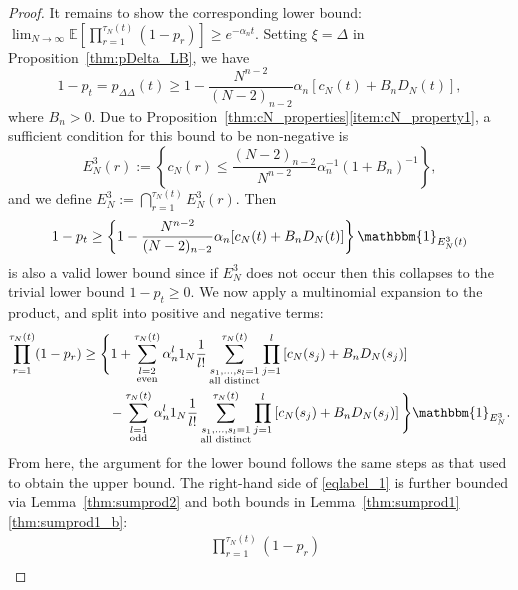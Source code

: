 \documentclass[12pt,authoryear]{article}
\theoremstyle{definition}
\newcommand{\E}{\mathbb{E}}
\newcommand{\1}[1]{\mathbbm{1}_{#1}}
\newcommand{\ON}{1_N}
\begin{document}
\begin{proof}
It remains to show the corresponding lower bound: $\lim_{N\to\infty} \E[ \prod_{r=1}^{\tau_N(t)} (1-p_r) ] 
\geq e^{-\alpha_n t}$.
Setting $\xi=\Delta$ in Proposition~\ref{thm:pDelta_LB}, we have
\begin{equation}\label{eq:pDeltaDelta_LB}
1-p_t
= p_{\Delta\Delta}(t) \geq 1 - \frac{N^{n-2}}{(N-2)_{n-2}} \alpha_n 
    [ c_N(t) + B_n D_N(t) ] ,
\end{equation}
where $B_n >0$.
Due to Proposition~\ref{thm:cN_properties}\ref{item:cN_property1}, a sufficient condition for this bound to be non-negative is
\begin{equation}\label{eq:defn_E3}
E_N^3(r)
:= \left\{ c_N(r) \leq \frac{(N-2)_{n-2}}{N^{n-2}} 
        \alpha_n^{-1} (1+B_n)^{-1} \right\} ,
\end{equation}
and we define $E_N^3 := \bigcap_{r=1}^{\tau_N(t)} E_N^3(r)$. 
Then
\begin{equation*}
1-p_t
\geq \left\{ 1 - \frac{N^{n-2}}{(N-2)_{n-2}} \alpha_n 
    [ c_N(t) + B_n D_N(t) ] \right\} \1{E_N^3(t)}
\end{equation*}
is also a valid lower bound since if $E_N^3$ does not occur then this collapses to the trivial lower bound $1-p_t \geq 0$.
We now apply a multinomial expansion to the product, and split into positive and negative terms:
\begin{align}
\prod_{r=1}^{\tau_N(t)} (1-p_r)
&\geq \Bigg\{ 1 + \sum_{\substack{l=2 \\ \text{even} }}^{\tau_N(t)} 
        \alpha_n^l \ON \frac{1}{l!} 
        \sum_{\substack{ s_1, \dots, s_l =1 \\ \text{all distinct} }}^{\tau_N(t)}
        \prod_{j=1}^l
        \left[ c_N(s_j) + B_n D_N(s_j) \right] \nonumber \\
    &\qquad- \sum_{\substack{l=1 \\ \text{odd} }}^{\tau_N(t)} 
        \alpha_n^l \ON \frac{1}{l!}
        \sum_{\substack{ s_1, \dots, s_l =1 \\ \text{all distinct} }}^{\tau_N(t)}
        \prod_{j=1}^l
        \left[ c_N(s_j) + B_n D_N(s_j) \right] \Bigg\} \1{E_N^3}. \label{eqlabel_1}
\end{align}
From here, the argument for the lower bound follows the same steps as that used to obtain the upper bound.
The right-hand side of \eqref{eqlabel_1} is further bounded via Lemma~\ref{thm:sumprod2} and both bounds in Lemma~\ref{thm:sumprod1}\ref{thm:sumprod1_b}:
\begin{align*}
&\prod_{r=1}^{\tau_N(t)} (1-p_r) \\

\end{align*}
\end{proof}
\end{document}
